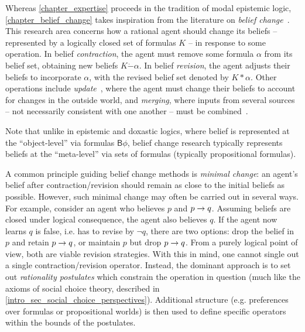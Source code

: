 {
    \newcommand{\contract}{\dot{-}}
    \newcommand{\reviseby}{\ast}

Whereas \cref{chapter_expertise} proceeds in the tradition of modal epistemic
logic, \cref{chapter_belief_change} takes inspiration from the literature on
\emph{belief change}~\cite{booth_belief_2011,sep_belief_change,ferme_2018}.
This research area concerns how a rational agent should change its beliefs --
represented by a logically closed set of formulas $K$\footnotemark{} --
in response to some operation. In belief \emph{contraction}, the agent must
remove some formula $\alpha$ from its belief set, obtaining new beliefs $K
\contract \alpha$. In belief \emph{revision}, the agent adjusts their beliefs
to incorporate $\alpha$, with the revised belief set denoted by $K \reviseby
\alpha$. Other operations include \emph{update}~\cite{katsuno_mendelzon_1992},
where the agent must change their beliefs to account for changes in the outside
world, and \emph{merging}, where inputs from several sources -- not necessarily
consistent with one another -- must be combined~\cite{konieczny2002merging}.


Note that unlike in epistemic and doxastic logics, where belief is represented
at the ``object-level'' via formulas $\mathsf{B}\phi$, belief change research
typically represents beliefs at the ``meta-level'' via sets of formulas
(typically propositional formulas).

A common principle guiding belief change methods is \emph{minimal change}: an
agent's belief after contraction/revision should remain as close to the initial
beliefs as possible. However, such minimal change may often be carried out in
several ways. For example, consider an agent who believes $p$ and $p \rightarrow
q$. Assuming beliefs are closed under logical consequence, the agent also
believes $q$. If the agent now learns $q$ is false, i.e. has to revise by
$\neg{q}$, there are two options: drop the belief in $p$ and retain $p
\rightarrow q$, or maintain $p$ but drop $p \rightarrow q$. From a purely logical
point of view, both are viable revision strategies. With this in mind, one
cannot single out a single contraction/revision operator. Instead, the dominant
approach is to set out \emph{rationality postulates} which constrain the
operation in question (much like the axioms of social choice theory, described
in \cref{intro_sec_social_choice_perspectives}). Additional structure (e.g.
preferences over formulas or propositional worlds) is then used to define
specific operators within the bounds of the postulates.

}
